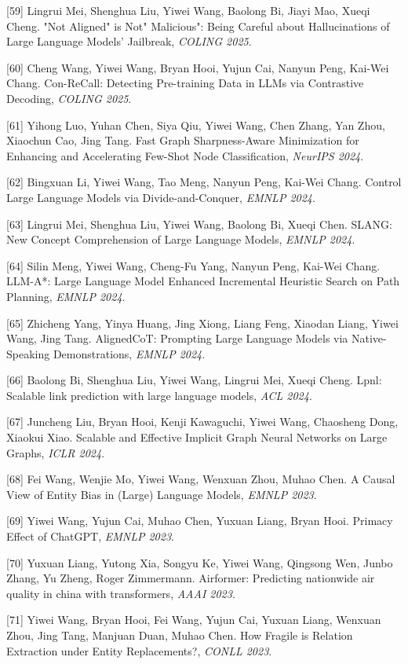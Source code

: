 [59] Lingrui Mei, Shenghua Liu, Yiwei Wang, Baolong Bi, Jiayi Mao, Xueqi Cheng. "Not Aligned" is Not" Malicious": Being Careful about Hallucinations of Large Language Models' Jailbreak, \textit{COLING 2025}.

[60] Cheng Wang, Yiwei Wang, Bryan Hooi, Yujun Cai, Nanyun Peng, Kai-Wei Chang. Con-ReCall: Detecting Pre-training Data in LLMs via Contrastive Decoding, \textit{COLING 2025}.

[61] Yihong Luo, Yuhan Chen, Siya Qiu, Yiwei Wang, Chen Zhang, Yan Zhou, Xiaochun Cao, Jing Tang. Fast Graph Sharpness-Aware Minimization for Enhancing and Accelerating Few-Shot Node Classification, \textit{NeurIPS 2024}.

[62] Bingxuan Li, Yiwei Wang, Tao Meng, Nanyun Peng, Kai-Wei Chang. Control Large Language Models via Divide-and-Conquer, \textit{EMNLP 2024}.

[63] Lingrui Mei, Shenghua Liu, Yiwei Wang, Baolong Bi, Xueqi Chen. SLANG: New Concept Comprehension of Large Language Models, \textit{EMNLP 2024}.

[64] Silin Meng, Yiwei Wang, Cheng-Fu Yang, Nanyun Peng, Kai-Wei Chang. LLM-A*: Large Language Model Enhanced Incremental Heuristic Search on Path Planning, \textit{EMNLP 2024}.

[65] Zhicheng Yang, Yinya Huang, Jing Xiong, Liang Feng, Xiaodan Liang, Yiwei Wang, Jing Tang. AlignedCoT: Prompting Large Language Models via Native-Speaking Demonstrations, \textit{EMNLP 2024}.

[66] Baolong Bi, Shenghua Liu, Yiwei Wang, Lingrui Mei, Xueqi Cheng. Lpnl: Scalable link prediction with large language models, \textit{ACL 2024}.

[67] Juncheng Liu, Bryan Hooi, Kenji Kawaguchi, Yiwei Wang, Chaosheng Dong, Xiaokui Xiao. Scalable and Effective Implicit Graph Neural Networks on Large Graphs, \textit{ICLR 2024}.

[68] Fei Wang, Wenjie Mo, Yiwei Wang, Wenxuan Zhou, Muhao Chen. A Causal View of Entity Bias in (Large) Language Models, \textit{EMNLP 2023}.

[69] Yiwei Wang, Yujun Cai, Muhao Chen, Yuxuan Liang, Bryan Hooi. Primacy Effect of ChatGPT, \textit{EMNLP 2023}.

[70] Yuxuan Liang, Yutong Xia, Songyu Ke, Yiwei Wang, Qingsong Wen, Junbo Zhang, Yu Zheng, Roger Zimmermann. Airformer: Predicting nationwide air quality in china with transformers, \textit{AAAI 2023}.

[71] Yiwei Wang, Bryan Hooi, Fei Wang, Yujun Cai, Yuxuan Liang, Wenxuan Zhou, Jing Tang, Manjuan Duan, Muhao Chen. How Fragile is Relation Extraction under Entity Replacements?, \textit{CONLL 2023}.

